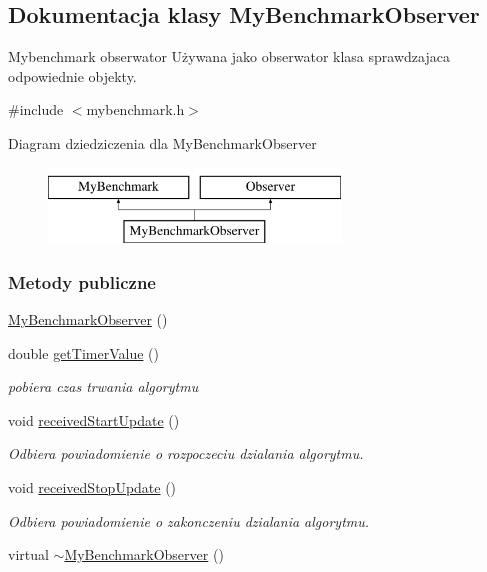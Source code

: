 \hypertarget{class_my_benchmark_observer}{\subsection{Dokumentacja klasy My\-Benchmark\-Observer}
\label{class_my_benchmark_observer}
}


Mybenchmark obserwator Używana jako obserwator klasa sprawdzajaca odpowiednie objekty.  




{\ttfamily \#include $<$mybenchmark.\-h$>$}

Diagram dziedziczenia dla My\-Benchmark\-Observer\begin{figure}[H]
\begin{center}
\leavevmode
\includegraphics[height=2.000000cm]{class_my_benchmark_observer}
\end{center}
\end{figure}
\subsubsection*{Metody publiczne}
\begin{DoxyCompactItemize}
\item 
\hyperlink{class_my_benchmark_observer_ad65d0afb1ea49dbdebd1aef5f374aa9a}{My\-Benchmark\-Observer} ()
\item 
double \hyperlink{class_my_benchmark_observer_a33ea57a2d321f835f3af0d3bab76a931}{get\-Timer\-Value} ()
\begin{DoxyCompactList}\small\item\em pobiera czas trwania algorytmu \end{DoxyCompactList}\item 
void \hyperlink{class_my_benchmark_observer_a50a758f459b683b82bbb32fa4c2f13df}{received\-Start\-Update} ()
\begin{DoxyCompactList}\small\item\em Odbiera powiadomienie o rozpoczeciu dzialania algorytmu. \end{DoxyCompactList}\item 
void \hyperlink{class_my_benchmark_observer_aaf6a636ef6e8d8f8f8bc6d540e432246}{received\-Stop\-Update} ()
\begin{DoxyCompactList}\small\item\em Odbiera powiadomienie o zakonczeniu dzialania algorytmu. \end{DoxyCompactList}\item 
virtual \hyperlink{class_my_benchmark_observer_addcc70a6c10af608874dc8613c84299f}{$\sim$\-My\-Benchmark\-Observer} ()
\end{DoxyCompactItemize}
